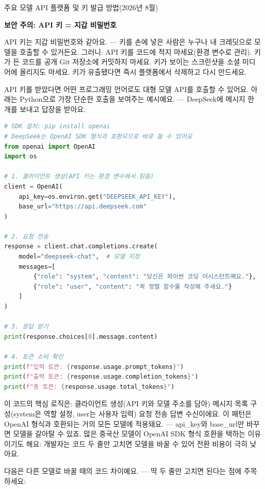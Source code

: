 \begin{center}\small\color{gray}주요 모델 API 플랫폼 및 키 발급 방법(2026년 8월)\end{center}

\textbf{보안 주의: API 키 = 지갑 비밀번호}\par

API 키는 지갑 비밀번호와 같아요. — 키를 손에 넣은 사람은 누구나 내 크레딧으로 모델을 호출할 수 있거든요. 그러니: API 키를 코드에 적지 마세요(환경 변수로 관리). 키가 든 코드를 공개 Git 저장소에 커밋하지 마세요. 키가 보이는 스크린샷을 소셜 미디어에 올리지도 마세요. 키가 유출됐다면 즉시 플랫폼에서 삭제하고 다시 만드세요.


API 키를 받았다면 어떤 프로그래밍 언어로도 대형 모델 API를 호출할 수 있어요. 아래는 Python으로 가장 단순한 호출을 보여주는 예시예요. — DeepSeek에 메시지 한 개를 보내고 답장을 받아요.

\begin{lstlisting}[language=Python]
# SDK 설치: pip install openai
# DeepSeek는 OpenAI SDK 형식과 호환되므로 바로 쓸 수 있어요
from openai import OpenAI
import os

# 1. 클라이언트 생성(API 키는 환경 변수에서 읽음)
client = OpenAI(
    api_key=os.environ.get("DEEPSEEK_API_KEY"),
    base_url="https://api.deepseek.com"
)

# 2. 요청 전송
response = client.chat.completions.create(
    model="deepseek-chat",  # 모델 지정
    messages=[
        {"role": "system", "content": "당신은 파이썬 코딩 어시스턴트예요."},
        {"role": "user", "content": "퀵 정렬 함수를 작성해 주세요."}
    ]
)

# 3. 응답 받기
print(response.choices[0].message.content)

# 4. 토큰 소비 확인
print(f"입력 토큰: {response.usage.prompt_tokens}")
print(f"출력 토큰: {response.usage.completion_tokens}")
print(f"총 토큰: {response.usage.total_tokens}")
\end{lstlisting}

이 코드의 핵심 로직은: 클라이언트 생성(API 키와 모델 주소를 담아) 메시지 목록 구성(system은 역할 설정, user는 사용자 입력) 요청 전송 답변 수신이에요. 이 패턴은 OpenAI 형식과 호환되는 거의 모든 모델에 적용돼요. — api\_key와 base\_url만 바꾸면 모델을 갈아탈 수 있죠. 많은 중국산 모델이 OpenAI SDK 형식 호환을 택하는 이유이기도 해요: 개발자는 코드 두 줄만 고치면 모델을 바꿀 수 있어 전환 비용이 극히 낮아요.

다음은 다른 모델로 바꿀 때의 코드 차이예요. — 딱 두 줄만 고치면 된다는 점에 주목하세요:

